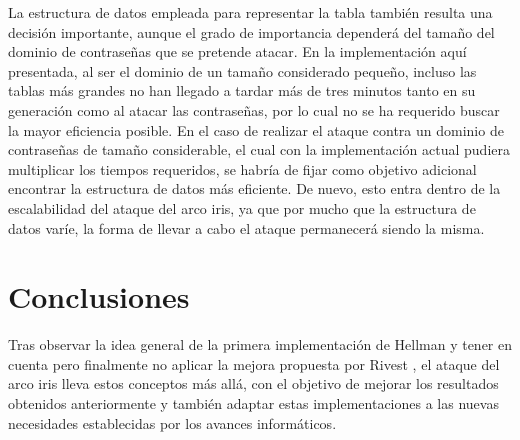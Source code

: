 \documentclass[12pt,spanish,listoffigures,listoftables,listofalgorithms]{tfgetsinf}
\begin{document}
La estructura de datos empleada para representar la tabla también resulta una decisión importante, aunque el grado de importancia dependerá del tamaño del dominio de contraseñas que se pretende atacar. En la implementación aquí presentada, al ser el dominio de un tamaño considerado pequeño, incluso las tablas más grandes no han llegado a tardar más de tres minutos tanto en su generación como al atacar las contraseñas, por lo cual no se ha requerido buscar la mayor eficiencia posible. En el caso de realizar el ataque contra un dominio de contraseñas de tamaño considerable, el cual con la implementación actual pudiera multiplicar los tiempos requeridos, se habría de fijar como objetivo adicional encontrar la estructura de datos más eficiente. De nuevo, esto entra dentro de la escalabilidad del ataque del arco iris, ya que por mucho que la estructura de datos varíe, la forma de llevar a cabo el ataque permanecerá siendo la misma.


\chapter{Conclusiones}

Tras observar la idea general de la primera implementación de Hellman \cite{hellman} y tener en cuenta pero finalmente no aplicar la mejora propuesta por Rivest \cite{rivest}, el ataque del arco iris lleva estos conceptos más allá, con el objetivo de mejorar los resultados obtenidos anteriormente y también adaptar estas implementaciones a las nuevas necesidades establecidas por los avances informáticos.
\end{document}

